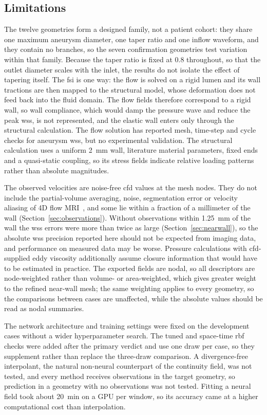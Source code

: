 \documentclass[12pt,a4paper]{article}
\newcommand{\CFD}{\ac{cfd}\xspace}
\newcommand{\FSI}{\ac{fsi}\xspace}
\newcommand{\WSS}{\ac{wss}\xspace}
\newcommand{\RBF}{\ac{rbf}\xspace}
\theoremstyle{definition}
\numberwithin{equation}{section}
\begin{document}
\subsection{Limitations}
\label{Limitations}
The twelve geometries form a designed family, not a patient cohort: they share one maximum aneurysm diameter, one taper ratio and one inflow waveform, and they contain no branches, so the seven confirmation geometries test variation within that family. Because the taper ratio is fixed at 0.8 throughout, so that the outlet diameter scales with the inlet, the results do not isolate the effect of tapering itself. The \FSI is one way: the flow is solved on a rigid lumen and its wall tractions are then mapped to the structural model, whose deformation does not feed back into the fluid domain. The flow fields therefore correspond to a rigid wall, so wall compliance, which would damp the pressure wave and reduce the peak \WSS, is not represented, and the elastic wall enters only through the structural calculation. The flow solution has reported mesh, time-step and cycle checks for aneurysm \WSS, but no experimental validation. The structural calculation uses a uniform 2~mm wall, literature material parameters, fixed ends and a quasi-static coupling, so its stress fields indicate relative loading patterns rather than absolute magnitudes.

The observed velocities are noise-free \CFD values at the mesh nodes. They do not include the partial-volume averaging, noise, segmentation error or velocity aliasing of 4D flow MRI~\cite{markl2012fourd}, and some lie within a fraction of a millimeter of the wall (Section~\ref{sec:observations}). Without observations within 1.25~mm of the wall the \WSS errors were more than twice as large (Section~\ref{sec:nearwall}), so the absolute \WSS precision reported here should not be expected from imaging data, and performance on measured data may be worse. Pressure calculations with \CFD-supplied eddy viscosity additionally assume closure information that would have to be estimated in practice. The exported fields are nodal, so all descriptors are node-weighted rather than volume- or area-weighted, which gives greater weight to the refined near-wall mesh; the same weighting applies to every geometry, so the comparisons between cases are unaffected, while the absolute values should be read as nodal summaries.

The network architecture and training settings were fixed on the development cases without a wider hyperparameter search. The tuned and space-time \RBF checks were added after the primary verdict and use one draw per case, so they supplement rather than replace the three-draw comparison. A divergence-free interpolant, the natural non-neural counterpart of the continuity field, was not tested, and every method receives observations in the target geometry, so prediction in a geometry with no observations was not tested. Fitting a neural field took about 20~min on a GPU per window, so its accuracy came at a higher computational cost than interpolation.
\end{document}
